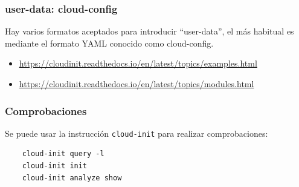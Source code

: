 \documentclass{beamer}
\begin{document}
\begin{frame}
  \frametitle{user-data: cloud-config}
  Hay varios formatos aceptados para introducir ``user-data'', el más
  habitual es mediante el formato YAML conocido como cloud-config.
  \begin{itemize}
  \item
    \url{https://cloudinit.readthedocs.io/en/latest/topics/examples.html}
  \item \url{https://cloudinit.readthedocs.io/en/latest/topics/modules.html}
  \end{itemize}
\end{frame}

\begin{frame}[fragile]
  \frametitle{Comprobaciones}
  Se puede usar la instrucción \texttt{cloud-init} para realizar comprobaciones:
  \begin{lstlisting}
    cloud-init query -l
    cloud-init init
    cloud-init analyze show
  \end{lstlisting}
\end{frame}
\end{document}
